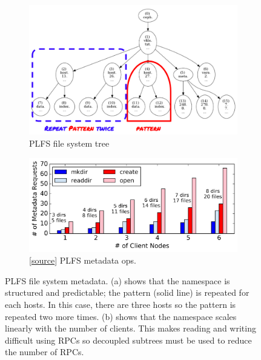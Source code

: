 \begin{figure}[tb]
    \centering
    \begin{subfigure}[b]{.45\linewidth}
      \centering
      \includegraphics[width=1\linewidth]{./chapters/tintenfisch/figures/tree_plfs.png} 
      \caption{PLFS file system tree}\label{fig:tree_plfs}
   \end{subfigure}
   \begin{subfigure}[b]{.45\linewidth}
     \centering
     \includegraphics[width=1\linewidth]{./chapters/tintenfisch/figures/plfs_problem.png} 
     \caption{[\href{https://github.com/michaelsevilla/tintenfisch-popper/blob/master/experiments/n1/vizualize.ipynb}{source}]
     PLFS metadata ops.}
     \label{fig:plfs_problem}
   \end{subfigure}
\caption{PLFS file system metadata. (a) shows that the namespace is structured
and predictable; the pattern (solid line) is repeated for each hosts. In this
case, there are three hosts so the pattern is repeated two more times. (b)
shows that the namespace scales linearly with the number of clients.  This
makes reading and writing difficult using RPCs so decoupled subtrees must be
used to reduce the number of RPCs.}
\end{figure}


